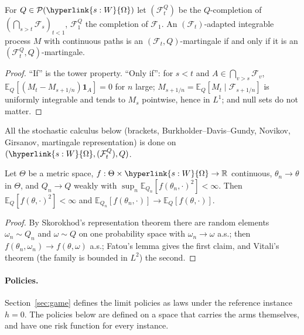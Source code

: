 \documentclass[11pt]{article}
\DeclareRobustCommand{\sy}[2]{{\hyperlink{#1}{#2}}}
\newcommand{\R}{\mathbb{R}}
\newcommand{\E}{\mathbb{E}}
\newcommand{\1}{\mathbf{1}}
\newcommand{\Om}{\sy{s:W}{\Omega}}
\begin{document}
\begin{lemma}\label{lem:g-UA}
For $Q\in\mathcal P(\Om)$ let $(\mathcal F^Q_t)$ be the $Q$-completion of $(\bigcap_{s>t}\mathcal F_s)_{t<1}$, $\mathcal F^Q_1$ the
completion of $\mathcal F_1$. An $(\mathcal F_t)$-adapted integrable process $M$ with continuous paths is an $(\mathcal F_t,Q)$-martingale if and only if it is an
$(\mathcal F^Q_t,Q)$-martingale.
\end{lemma}
\begin{proof}
``If'' is the tower property. ``Only if'': for $s<t$ and $A\in\bigcap_{v>s}\mathcal F_v$, $\E_Q[(M_t-M_{s+1/n})\1_A]=0$ for $n$ large;
$M_{s+1/n}=\E_Q[M_t\mid\mathcal F_{s+1/n}]$ is uniformly integrable and tends to $M_s$ pointwise, hence in $L^1$; and null sets do not matter.
\end{proof}
\noindent All the stochastic calculus below (brackets, Burkholder--Davis--Gundy, Novikov, Girsanov, martingale representation) is done on $(\Om,(\mathcal F^Q_t),Q)$.

\begin{lemma}\label{lem:g-V}
Let $\Theta$ be a metric space, $f:\Theta\times\Om\to\R$ continuous, $\theta_n\to\theta$ in $\Theta$, and $Q_n\to Q$ weakly with
$\sup_n\E_{Q_n}[f(\theta_n,\cdot)^2]<\infty$. Then $\E_Q[f(\theta,\cdot)^2]<\infty$ and $\E_{Q_n}[f(\theta_n,\cdot)]\to\E_Q[f(\theta,\cdot)]$.
\end{lemma}
\begin{proof}
By Skorokhod's representation theorem there are random elements $\omega_n\sim Q_n$ and $\omega\sim Q$ on one probability space with $\omega_n\to\omega$ a.s.; then
$f(\theta_n,\omega_n)\to f(\theta,\omega)$ a.s.; Fatou's lemma gives the first claim, and Vitali's theorem (the family is bounded in $L^2$) the second.
\end{proof}

\paragraph{Policies.} Section~\ref{sec:game} defines the limit policies as laws under the reference instance $h=0$. The policies below are defined on a space that
carries the arms themselves, and have one risk function for every instance.
\end{document}
